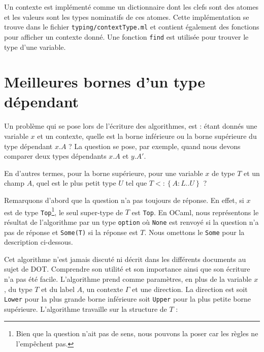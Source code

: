 Un contexte est implémenté comme un dictionnaire dont les clefs sont des atomes
et les valeurs sont les types nominatifs de ces atomes. Cette implémentation se
trouve dans le fichier \verb|typing/contextType.ml| et contient également
des fonctions pour afficher un contexte donné. Une fonction \verb|find| est utilisée
pour trouver le type d'une variable.

\section{Meilleures bornes d'un type dépendant}

Un problème qui se pose lors de l'écriture des algorithmes, est : étant donnés une variable
$x$ et un contexte, quelle est la borne inférieure ou la borne supérieure du
type dépendant $x.A$ ? La question se pose, par exemple, quand nous devons
comparer deux types dépendants $x.A$ et $y.A'$.

En d'autres termes, pour la borne supérieure, pour une variable $x$ de type $T$ et
un champ $A$, quel est le plus petit type $U$ tel que $T <: \left\{ A : L .. U
\right\}$ ?

Remarquons d'abord que la question n'a pas toujours de réponse. En effet, si $x$
est de type \verb|Top|\footnote{Bien que la question n'ait pas de sens, nous
  pouvons la poser car les règles ne l'empêchent pas.}, le seul super-type de
$T$ est \verb|Top|. En OCaml, nous représentons le résultat de l'algorithme par un
type \verb|option| où \verb|None| est renvoyé si la question n'a pas de réponse
et \verb|Some(T)| si la réponse est $T$. Nous omettons le \verb|Some| pour la
description ci-dessous.

Cet algorithme n'est jamais discuté ni décrit dans les différents
documents au sujet de DOT. Comprendre son utilité et son importance ainsi que
son écriture n'a pas été facile.
L'algorithme prend comme
paramètres, en plus de la variable $x$, du type $T$ et du label $A$, un contexte
$\Gamma$ et une direction. La direction est soit \verb|Lower| pour la
plus grande borne inférieure soit \verb|Upper| pour la plus petite borne
supérieure. L'algorithme travaille sur la structure de $T$ :

